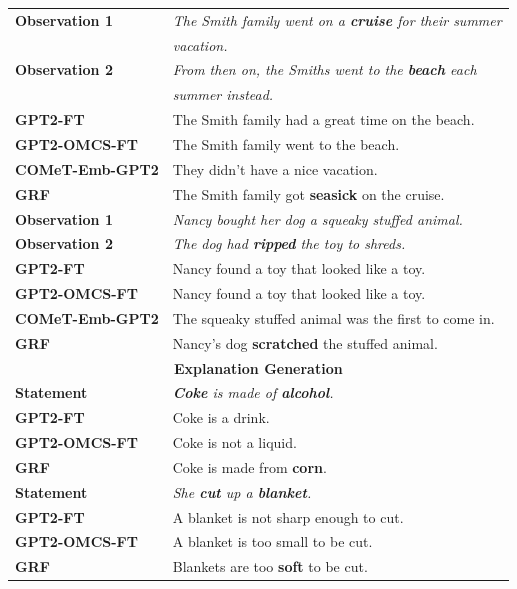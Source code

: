 \documentclass[11pt,a4paper]{article}
\begin{document}
\begin{table}[!t]
{\begin{tabular}{l l}
        \midrule[1pt]
        \textbf{Observation 1} & \textit{The Smith family went on a \textcolor{myblue}{\textbf{cruise}} for their summer} \\
        {} & \textit{vacation.} \\
        \textbf{Observation 2} & \textit{From then on, the Smiths went to the \textcolor{myblue}{\textbf{beach}} each}\\
        {} & \textit{summer instead.} \\
        \midrule[1pt]
        \textbf{GPT2-FT} & The Smith family had a great time on the beach. \\
        \textbf{GPT2-OMCS-FT} & The Smith family went to the beach. \\
        \textbf{COMeT-Emb-GPT2} & They didn't have a nice vacation. \\
        \textbf{GRF} & The Smith family got \textcolor{myorange}{\textbf{seasick}} on the cruise. \\
        \midrule[1pt]
        \textbf{Observation 1} & \textit{Nancy bought her dog a squeaky stuffed animal.} \\
        \textbf{Observation 2} & \textit{The dog had \textcolor{myblue}{\textbf{ripped}} the toy to shreds.} \\
        \midrule[1pt]
        \textbf{GPT2-FT} & Nancy found a toy that looked like a toy. \\
        \textbf{GPT2-OMCS-FT} & Nancy found a toy that looked like a toy. \\
        \textbf{COMeT-Emb-GPT2} & The squeaky stuffed animal was the first to come in. \\
        \textbf{GRF} & Nancy's dog \textcolor{myorange}{\textbf{scratched}} the stuffed animal. \\
        \midrule[1pt]
        \multicolumn{2}{c}{\textbf{Explanation Generation}} \\
        \midrule[1pt]
        \textbf{Statement} & \textit{\textcolor{myblue}{\textbf{Coke}} is made of \textcolor{myblue}{\textbf{alcohol}}.} \\
        \midrule[1pt]
        \textbf{GPT2-FT} & {Coke is a drink.} \\
        \textbf{GPT2-OMCS-FT} & {Coke is not a liquid.} \\
        \textbf{GRF} & {Coke is made from \textcolor{myorange}{\textbf{corn}}.} \\
        \midrule[1pt]
        \textbf{Statement} & \textit{She \textcolor{myblue}{\textbf{cut}} up a \textcolor{myblue}{\textbf{blanket}}.} \\
        \midrule[1pt]
        \textbf{GPT2-FT} & A blanket is not sharp enough to cut. \\
        \textbf{GPT2-OMCS-FT} & A blanket is too small to be cut. \\
        \textbf{GRF} & Blankets are too \textcolor{myorange}{\textbf{soft}} to be cut. \\
        

\end{tabular}}
\end{table}
\end{document}
